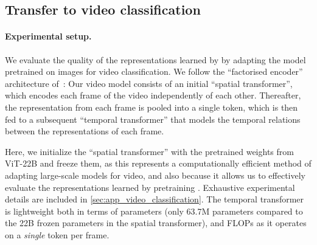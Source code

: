 

\subsection{Transfer to video classification}
\paragraph{Experimental setup.}
We evaluate the quality of the representations learned by \chonk by adapting the model pretrained on images for video classification.
We follow the ``factorised encoder'' architecture of~\citet{arnab2021vivit}: Our video model consists of an initial ``spatial transformer'', which encodes each frame of the video independently of each other.
Thereafter, the representation from each frame is pooled into a single token, which is then fed to a subsequent ``temporal transformer'' that models the temporal relations between the representations of each frame.

Here, we initialize the ``spatial transformer'' with the pretrained weights from ViT-22B and freeze them, as this represents a computationally efficient method of adapting large-scale models for video, and also because it allows us to effectively evaluate the representations learned by pretraining \chonk. Exhaustive experimental details are included in \cref{sec:app_video_classification}. The temporal transformer is lightweight both in terms of parameters (only 63.7M parameters compared to the 22B frozen parameters in the spatial transformer), and FLOPs as it operates on a \emph{single} token per frame.

